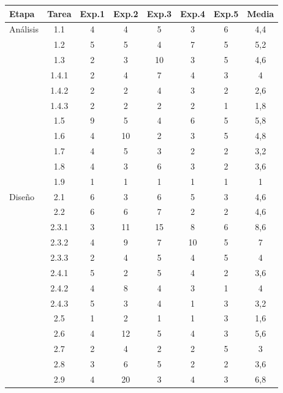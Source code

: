 \documentclass[11pt,a4paper,spanish,twoside]{report}
\begin{document}
\begin{table}[!h]
\centering
  \begin{tabular}{|p{2.5cm}|c|c|c|c|c|c|c|}
    \hline
    \textbf{Etapa} & \textbf{Tarea} & \textbf{Exp.1} & \textbf{Exp.2} &
    \textbf{Exp.3} & \textbf{Exp.4} & \textbf{Exp.5} & \textbf{Media} \\
    \hline \hline
    Análisis & 1.1 & 4 & 4 & 5 & 3 & 6 & 4,4\\
    \cline{2-8}
    & 1.2 & 5 & 5 & 4 & 7 & 5 & 5,2\\
    \cline{2-8}
    & 1.3 & 2 & 3 & 10 & 3 & 5 & 4,6\\
    \cline{2-8}
    & 1.4.1 & 2 & 4 & 7 & 4 & 3 & 4\\
    \cline{2-8}
    & 1.4.2 & 2 & 2 & 4 & 3 & 2 & 2,6\\
    \cline{2-8}
    & 1.4.3 & 2 & 2 & 2 & 2 & 1 & 1,8\\
    \cline{2-8}
    & 1.5 & 9 & 5 & 4 & 6 & 5 & 5,8\\
    \cline{2-8}
    & 1.6 & 4 & 10 & 2 & 3 & 5 & 4,8\\
    \cline{2-8}
    & 1.7 & 4 & 5 & 3 & 2 & 2 & 3,2\\
    \cline{2-8}
    & 1.8 & 4 & 3 & 6 & 3 & 2 & 3,6\\
    \cline{2-8}
    & 1.9 & 1 & 1 & 1 & 1 & 1 & 1\\
    \hline
    Diseño & 2.1 & 6 & 3 & 6 & 5 & 3 & 4,6\\
    \cline{2-8}
    & 2.2 & 6 & 6 & 7 & 2 & 2 & 4,6\\
    \cline{2-8}
    & 2.3.1 & 3 & 11 & 15 & 8 & 6 & 8,6\\
    \cline{2-8}
    & 2.3.2 & 4 & 9 & 7 & 10 & 5 & 7\\
    \cline{2-8}
    & 2.3.3 & 2 & 4 & 5 & 4 & 5 & 4\\
    \cline{2-8}
    & 2.4.1 & 5 & 2 & 5 & 4 & 2 & 3,6\\
    \cline{2-8}
    & 2.4.2 & 4 & 8 & 4 & 3 & 1 & 4\\
    \cline{2-8}
    & 2.4.3 & 5 & 3 & 4 & 1 & 3 & 3,2\\
    \cline{2-8}
    & 2.5 & 1 & 2 & 1 & 1 & 3 & 1,6\\
    \cline{2-8}
    & 2.6 & 4 & 12 & 5 & 4 & 3 & 5,6\\
    \cline{2-8}
    & 2.7 & 2 & 4 & 2 & 2 & 5 & 3\\
    \cline{2-8}
    & 2.8 & 3 & 6 & 5 & 2 & 2 & 3,6\\
    \cline{2-8}
    & 2.9 & 4 & 20 & 3 & 4 & 3 & 6,8\\

\end{tabular}
\end{table}
\end{document}
